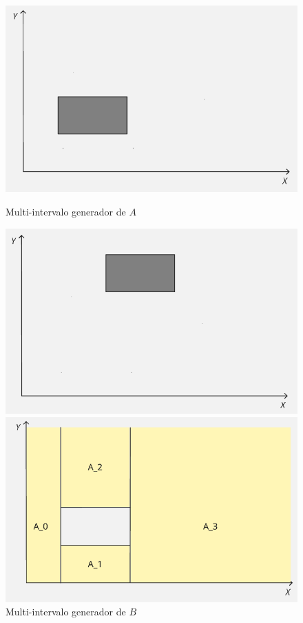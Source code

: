 \begin{figure}[htbp]
    \centering
    \begin{minipage}[t]{0.49\textwidth}
        \centering
        \includegraphics[width=\linewidth]{figures/Optimazaciones/Complement/Aelem.png}
        \caption*{\small Multi-intervalo generador de $A$}
        \vspace{8pt}
        \includegraphics[width=\linewidth]{figures/Optimazaciones/Complement/Belem.png}
        \caption*{\small Multi-intervalo generador de $B$}
    \end{minipage}%
    \hspace{0.01\textwidth}
    \begin{minipage}[t]{0.49\textwidth}
        \centering
        \includegraphics[width=\linewidth]{figures/Optimazaciones/Complement/A.png}

\end{minipage}
\end{figure}
